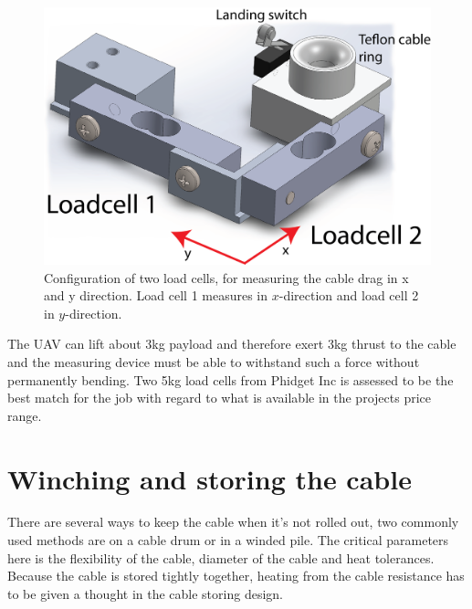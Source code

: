 \begin{figure}[hbtp]
\centering
\includegraphics[scale=0.75]{graphics/cad/loadcell.png}
\caption[Configuration of two load cells, for measuring the cable drag]{Configuration of two load cells, for measuring the cable drag in x and y direction. Load cell 1 measures in $x$-direction and load cell 2 in $y$-direction.}
\label{fig:loadcells}
\end{figure}

\noindent
The UAV can lift about 3kg payload and therefore exert 3kg thrust to the cable and the measuring device must be able to withstand such a force without permanently bending. Two 5kg load cells from Phidget Inc is assessed to be the best match for the job with regard to what is available in the projects price range.








\section{Winching and storing the cable}
There are several ways to keep the cable when it's not rolled out, two commonly used methods are on a cable drum or in a winded pile. The critical parameters here is the flexibility of the cable, diameter of the cable and heat tolerances.  Because the cable is stored tightly together, heating from the cable resistance has to be given a thought in the cable storing design.

